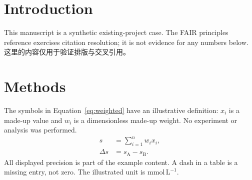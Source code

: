 \section{Introduction}\label{sec:introduction}
This manuscript is a synthetic existing-project case. The FAIR principles
reference exercises citation resolution\cite{wilkinson2016fair}; it is not
evidence for any numbers below. 这里的内容仅用于验证排版与交叉引用。

\section{Methods}\label{sec:methods}
The symbols in Equation~\eqref{eq:weighted} have an illustrative definition:
\(x_i\) is a made-up value and \(w_i\) is a dimensionless made-up weight.
No experiment or analysis was performed.
\begin{align}
  s &= \sum_{i=1}^{n} w_i x_i,\label{eq:weighted}\\
  \Delta s &= s_{\mathrm{A}}-s_{\mathrm{B}}.\label{eq:difference}
\end{align}
All displayed precision is part of the example content. A dash in a table is
a missing entry, not zero. The illustrated unit is \(\mathrm{mmol\,L^{-1}}\).
